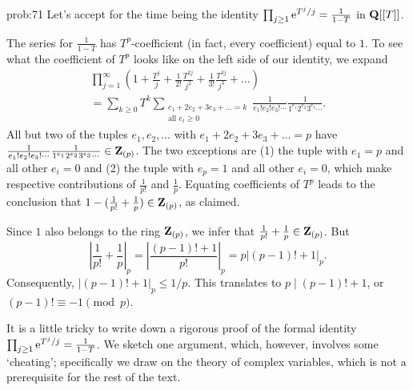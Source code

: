 \begin{sol}{prob:71}  Let's accept for the time being the identity $\prod_{j\ge 1}\mathrm{e}^{T^j/j}= \frac{1}{1-T}$ in $\mathbf{Q}[[T]]$. 

The series for $\frac{1}{1-T}$ has $T^p$-coefficient (in fact, every coefficient) equal to $1$. To see what the coefficient of $T^p$ looks like on the left side of our identity, we expand
\begin{multline*}\prod_{j=1}^{\infty} \left(1 + \frac{T^j}{j} + \frac{1}{2!} \frac{T^{2j}}{j^2} + \frac{1}{3!}\frac{T^{3j}}{j^3} + \dots\right) \\= \sum_{k\ge 0} T^k \sum_{\substack{e_1+2e_2 + 3e_3 + \dots = k \\ \text{all $e_i \ge 0$}}} \frac{1}{e_1! e_2! e_3!\cdots} \frac{1}{1^{e_1} 2^{e_2} 3^{e_3} \cdots}.  \end{multline*}
All but two of the tuples $e_1,e_2,\dots$ with $e_1+2e_2 + 3e_3 + \dots = p$ have $\frac{1}{e_1! e_2! e_3!\cdots} \frac{1}{1^{e_1} 2^{e_2} 3^{e_3}\cdots} \in \mathbf{Z}_{(p)}$. The two exceptions are (1) the tuple with $e_1=p$ and all other $e_i=0$ and (2) the tuple with $e_p=1$ and all other $e_i=0$, which make respective contributions of $\frac{1}{p!}$ and $\frac{1}{p}$. Equating coefficients of $T^p$ leads to the conclusion that $1 - (\frac{1}{p!} + \frac{1}{p}) \in \mathbf{Z}_{(p)}$, as claimed.

Since $1$ also belongs to the ring $\mathbf{Z}_{(p)}$,  we infer that $\frac{1}{p!} + \frac{1}{p} \in \mathbf{Z}_{(p)}$. But
\[ \left|\frac{1}{p!} + \frac{1}{p}\right|_{p} = \left|\frac{(p-1)!+1}{p!}\right|_p = p |(p-1)!+1|_p. \]
Consequently, $|(p-1)!+1|_p \le 1/p$. This translates to $p\mid (p-1)!+1$, or $(p-1)!\equiv -1\pmod{p}$.

\begin{rmk} It is a little tricky to write down a rigorous proof of the formal identity $\prod_{j\ge 1} \mathrm{e}^{T^j/j} = \frac{1}{1-T}$. We sketch one argument, which, however, involves some `cheating'; specifically we draw  on the theory of complex variables, which is not a prerequisite for the rest of the text.


\end{rmk}
\end{sol}
